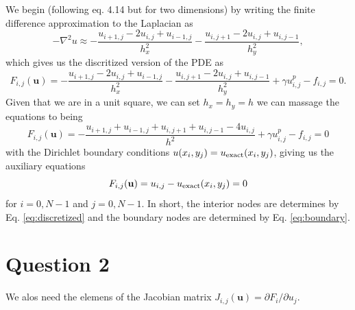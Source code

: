 \documentclass[12pt]{article}
\begin{document}
We begin (following eq. 4.14 but for two dimensions) by writing the finite difference approximation to the Laplacian as
\begin{equation}
    -\nabla^{2}u\approx-\frac{u_{i+1,j}-2u_{i,j}+u_{i-1,j}}{h_{x}^{2}}-\frac{u_{i,j+1}-2u_{i,j}+u_{i,j-1}}{h_{y}^{2}},
\end{equation}
which gives us the discritized version of the PDE as
\begin{equation}
    F_{i,j}(\mathbf{u})=-\frac{u_{i+1,j}-2u_{i,j}+u_{i-1,j}}{h_{x}^{2}}-\frac{u_{i,j+1}-2u_{i,j}+u_{i,j-1}}{h_{y}^{2}}+\gamma u_{i,j}^p-f_{i,j} = 0.
\end{equation}
Given that we are  in a unit square, we can set $h_x = h_y = h$ we can massage the equations to being
\begin{equation}
    F_{i,j}(\mathbf{u})=-\frac{u_{i+1,j}+u_{i-1,j}+u_{i,j+1}+u_{i,j-1}-4u_{i,j}}{h^{2}}+\gamma u_{i,j}^p-f_{i,j} = 0
    \label{eq:discretized}
\end{equation}
with the Dirichlet boundary conditions $u(x_i, y_j) = u_{\rm exact}(x_i, y_j)$, giving us the auxiliary equations
\begin{equation}
    F_{i,j}(\mathbf{u}) = u_{i,j} - u_{\rm exact}(x_i, y_j) = 0
    \label{eq:boundary}
\end{equation}
for $i = 0, N-1$ and $j = 0, N-1$. In short, the interior nodes are determines by Eq. \ref{eq:discretized} and the boundary nodes are determined by Eq. \ref{eq:boundary}.

\section{Question 2}
We alos need the elemens of the Jacobian matrix $J_{i,j}(\mathbf{u}) = \partial F_i / \partial u_j$.
\end{document}
